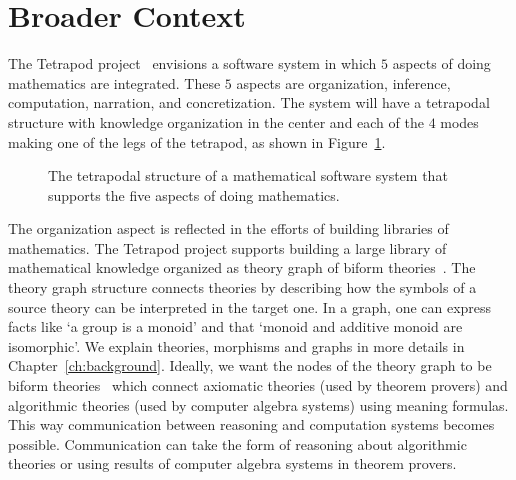 \section{Broader Context}
\label{sec:broader_context}
The Tetrapod project~\cite{carette2020bigMath} envisions a software system in which $5$ aspects of doing mathematics are integrated. These $5$ aspects are organization, inference, computation, narration, and concretization. The system will have a tetrapodal structure with knowledge organization in the center and each of the $4$ modes making one of the legs of the tetrapod, as shown in Figure~\ref{fig:tetrapod}. 
\begin{figure}[h]
\caption{The tetrapodal structure of a mathematical software system that supports the five aspects of doing mathematics. }
\label{fig:tetrapod}
\end{figure}

The organization aspect is reflected in the efforts of building libraries of mathematics. The Tetrapod project supports building a large library of mathematical knowledge organized as theory graph of biform theories~\cite{biformCICM2018}. The theory graph structure connects theories by describing how the symbols of a source theory can be interpreted in the target one. In a graph, one can express facts like `a group is a monoid' and that `monoid and additive monoid are isomorphic'. We explain theories, morphisms and graphs in more details in Chapter~\ref{ch:background}. 
Ideally, we want the nodes of the theory graph to be biform theories~\cite{biformCICM2018} which connect axiomatic theories  (used by theorem provers) and algorithmic theories (used by computer algebra systems) using meaning formulas. This way communication between reasoning and computation systems becomes possible. Communication can take the form of reasoning about algorithmic theories or using results of computer algebra systems in theorem provers.

